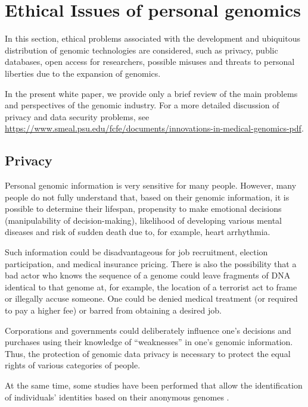 \section{Ethical Issues of personal genomics}
\begin{overview}
  In this section, ethical problems associated with the development and ubiquitous distribution of genomic technologies are considered, such as privacy, public databases, open access for researchers, possible misuses and threats to personal liberties due to the expansion of genomics.
\end{overview}



\begin{note}
  In the present white paper, we provide only a brief review of the main problems and perspectives of the genomic industry.
  For a more detailed discussion of privacy and data security problems, see \url{https://www.smeal.psu.edu/fcfe/documents/innovations-in-medical-genomics-pdf}.
\end{note}

\subsection{Privacy}

Personal genomic information is very sensitive for many people. However, many people do not fully understand that, based on their genomic information, it is possible to determine their lifespan, propensity to make emotional decisions (manipulability of decision-making), likelihood of developing various mental diseases and risk of sudden death due to, for example, heart arrhythmia.

Such information could be disadvantageous for job recruitment, election participation, and medical insurance pricing. There is also the possibility that a bad actor who knows the sequence of a genome could leave fragments of DNA identical to that genome at, for example, the location of a terrorist act to frame or illegally accuse someone. One could be denied medical treatment (or required to pay a higher fee) or barred from obtaining a desired job.

Corporations and governments could deliberately influence one’s decisions and purchases using their knowledge of “weaknesses” in one’s genomic information. Thus, the protection of genomic data privacy is necessary to protect the equal rights of various categories of people.

At the same time, some studies have been performed that allow the identification of individuals’ identities based on their anonymous genomes
\cite{Gymrek321,nature:the-genome-hacker}.

